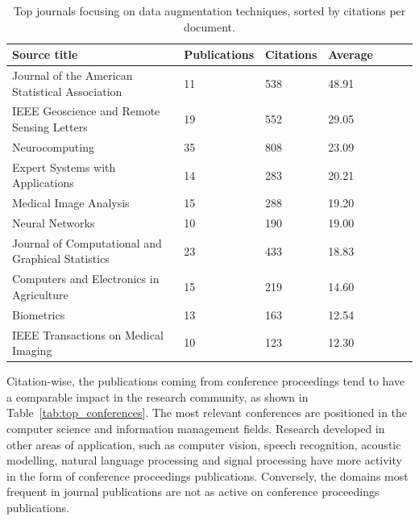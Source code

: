 \documentclass[parskip=full]{scrartcl}
\begin{document}
\begin{table}[ht]
    \begin{center}
    \caption{\label{tab:top_journals}
        Top journals focusing on data augmentation techniques, sorted by
        citations per document.
    }
    \begin{tabular*}{\textwidth}{@{\extracolsep{\fill}}lllllll@{\extracolsep{\fill}}}
        \toprule
        Source title & Publications & Citations & Average \\
        \midrule
        Journal of the American Statistical Association & 11 & 538 & 48.91 \\
        IEEE Geoscience and Remote Sensing Letters & 19 & 552 & 29.05 \\
        Neurocomputing & 35 & 808 & 23.09 \\
        Expert Systems with Applications & 14 & 283 & 20.21 \\
        Medical Image Analysis & 15 & 288 & 19.20 \\
        Neural Networks & 10 & 190 & 19.00 \\
        Journal of Computational and Graphical Statistics & 23 & 433 & 18.83 \\
        Computers and Electronics in Agriculture & 15 & 219 & 14.60 \\
        Biometrics & 13 & 163 & 12.54 \\
        IEEE Transactions on Medical Imaging & 10 & 123 & 12.30 \\
        \bottomrule
    \end{tabular*}
    \end{center}
\end{table}

Citation-wise, the publications coming from conference proceedings tend to
have a comparable impact in the research community, as shown in
Table~\ref{tab:top_conferences}. The most relevant conferences are positioned
in the computer science and information management fields. Research developed
in other areas of application, such as computer vision, speech recognition,
acoustic modelling, natural language processing and signal processing have
more activity in the form of conference proceedings publications. Conversely,
the domains most frequent in journal publications are not as active on
conference proceedings publications.
\end{document}
